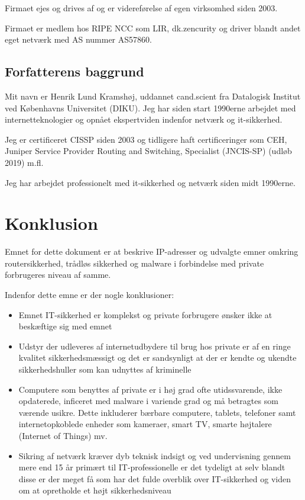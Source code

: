 \documentclass[a4paper,11pt,notitlepage]{report}
\begin{document}
Firmaet ejes og drives af \consultant og er videreførelse af egen virksomhed siden 2003.

Firmaet er medlem hos RIPE NCC som LIR, dk.zencurity og driver blandt andet eget netværk med AS nummer AS57860.

\section*{Forfatterens baggrund}

Mit navn er Henrik Lund Kramshøj, uddannet cand.scient fra Datalogisk Institut ved Københavns Universitet (DIKU). Jeg har siden start 1990erne arbejdet med internetteknologier og opnået ekspertviden indenfor netværk og it-sikkerhed.

Jeg er certificeret CISSP siden 2003 og tidligere haft certificeringer som CEH, Juniper  Service Provider Routing and Switching, Specialist (JNCIS-SP) (udløb 2019) m.fl.

Jeg har arbejdet professionelt med it-sikkerhed og netværk siden midt 1990erne.

\chapter{Konklusion}

Emnet for dette dokument er at beskrive IP-adresser og udvalgte emner omkring routersikkerhed, trådløs sikkerhed og malware i forbindelse med private forbrugeres niveau af samme.

Indenfor dette emne er der nogle konklusioner:
\begin{itemize}
\item Emnet IT-sikkerhed er komplekst og private forbrugere ønsker ikke at beskæftige sig med emnet
\item Udstyr der udleveres af internetudbydere til brug hos private er af en ringe kvalitet sikkerhedsmæssigt og det er sandsynligt at der er kendte og ukendte sikkerhedshuller som kan udnyttes af kriminelle
\item Computere som benyttes af private er i høj grad ofte utidssvarende, ikke opdaterede, inficeret med malware i variende grad og må betragtes som værende usikre. Dette inkluderer bærbare computere, tablets, telefoner samt internetopkoblede enheder som kameraer, smart TV, smarte højtalere (Internet of Things) mv.
\item Sikring af netværk kræver dyb teknisk indsigt og ved undervisning gennem mere end 15 år primært til IT-professionelle er det tydeligt at selv blandt disse er der meget få som har det fulde overblik over IT-sikkerhed og viden om at opretholde et højt sikkerhedsniveau
\end{itemize}
\end{document}
